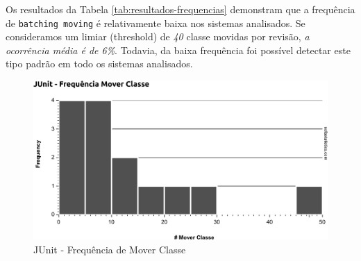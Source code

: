 \documentclass[12pt]{article}
\begin{document}
\begin{table}[]
	\centering
	\caption{Frequência da Movimentação das Classes}
	\label{tab:resultados-frequencias}
\end{table} 


Os resultados da Tabela \ref{tab:resultados-frequencias} demonstram que a frequência de \texttt{batching moving} é relativamente baixa nos sistemas analisados. Se consideramos um limiar  (threshold) de \textit{40} classe movidas por revisão, \textit{a ocorrência média é de 6\%}. Todavia, da baixa frequência foi possível detectar este tipo padrão em todo os sistemas analisados.

\begin{figure}[htb]
	\centering
	\includegraphics[width=0.9\linewidth]{../img/0014_Histogram_JUnit_Frequencia_Mover_Classe}
	\caption{JUnit - Frequência de Mover Classe}
	\label{fig:resultado-junit}
\end{figure}
\end{document}
